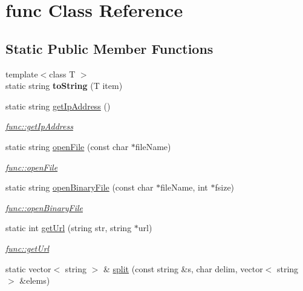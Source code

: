 \hypertarget{classfunc}{}\section{func Class Reference}
\label{classfunc}
\subsection*{Static Public Member Functions}
\begin{DoxyCompactItemize}
\item 
\hypertarget{classfunc_ac581d02d88f923f43f6e507b135ba6e5}{}{\footnotesize template$<$class T $>$ }\\static string {\bfseries to\+String} (T item)\label{classfunc_ac581d02d88f923f43f6e507b135ba6e5}

\item 
static string \hyperlink{classfunc_a36bd8c048b9131d38ba31bb61bb41800}{get\+Ip\+Address} ()
\begin{DoxyCompactList}\small\item\em \hyperlink{classfunc_a36bd8c048b9131d38ba31bb61bb41800}{func\+::get\+Ip\+Address} \end{DoxyCompactList}\item 
static string \hyperlink{classfunc_a9a5d752d785a76823f94b4cc7c40f411}{open\+File} (const char $\ast$file\+Name)
\begin{DoxyCompactList}\small\item\em \hyperlink{classfunc_a9a5d752d785a76823f94b4cc7c40f411}{func\+::open\+File} \end{DoxyCompactList}\item 
static string \hyperlink{classfunc_a073c637fff7acd1dbd46ed0e36aca523}{open\+Binary\+File} (const char $\ast$file\+Name, int $\ast$fsize)
\begin{DoxyCompactList}\small\item\em \hyperlink{classfunc_a073c637fff7acd1dbd46ed0e36aca523}{func\+::open\+Binary\+File} \end{DoxyCompactList}\item 
static int \hyperlink{classfunc_a7906b81c00a850d060d41ab192f26642}{get\+Url} (string str, string $\ast$url)
\begin{DoxyCompactList}\small\item\em \hyperlink{classfunc_a7906b81c00a850d060d41ab192f26642}{func\+::get\+Url} \end{DoxyCompactList}\item 
static vector$<$ string $>$ \& \hyperlink{classfunc_a4b7932b4cfd2c66a8d64d13bec30e1c8}{split} (const string \&s, char delim, vector$<$ string $>$ \&elems)

\end{DoxyCompactItemize}
